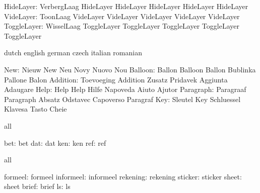   HideLayer: VerbergLaag HideLayer
             HideLayer   HideLayer
             HideLayer   HideLayer
  VideLayer: ToonLaag    VideLayer
             VideLayer   VideLayer
             VideLayer   VideLayer
ToggleLayer: WisselLaag  ToggleLayer
             ToggleLayer ToggleLayer
             ToggleLayer ToggleLayer

\stopvariables


\startvariables            dutch                     english
                           german                    czech
                           italian                   romanian

                      New: Nieuw                     New
                           Neu                       Novy
                           Nuovo                     Nou
                  Balloon: Ballon                    Balloon
                           Ballon                    Bublinka
                           Pallone                   Balon
                 Addition: Toevoeging                Addition
                           Zusatz                    Pridavek
                           Aggiunta                  Adaugare
                     Help: Help                      Help
                           Hilfe                     Napoveda
                           Aiuto                     Ajutor
                Paragraph: Paragraaf                 Paragraph
                           Absatz                    Odstavec
                           Capoverso                 Paragraf
                      Key: Sleutel                   Key
                           Schluessel                Klavesa
                           Tasto                     Cheie
\stopvariables




\startconstants            all

                      bet: bet
                      dat: dat
                      ken: ken
                      ref: ref

\stopconstants

\startvariables            all

                  formeel: formeel
                informeel: informeel
                 rekening: rekening
                  sticker: sticker
                    sheet: sheet
                    brief: brief
                       ls: ls

\stopvariables


\stoplogginginterface

\endinput

